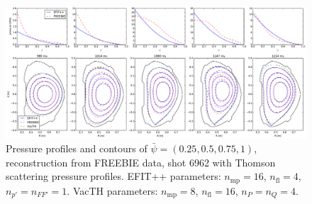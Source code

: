 \begin{figure}
\centering   %
\hfill{}
\includegraphics[width=18cm]{figures/example_6962_TS_noise.pdf}
\hfill{}
\caption{Pressure profiles and contours of $\bar\psi=\left(0.25,0.5,0.75,1\right)$, reconstruction from FREEBIE data, shot 6962 with Thomson scattering pressure profiles. EFIT++ parameters: $n_\mathrm{mp} = 16$, $n_\mathrm{fl} = 4$, $n_{p'} = n_{FF'} = 1$. VacTH parameters: $n_\mathrm{mp} = 8$, $n_\mathrm{fl} = 16$, $n_P = n_Q = 4$.}
\label{fig:ex6962}
\end{figure}

